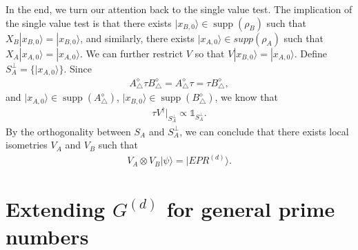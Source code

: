 \documentclass[11pt,letterpaper]{article}
\newcommand{\ket}[1]{|#1\rangle}
\newcommand{\ketbra}[2]{|#1\rangle\langle#2|}
\newcommand{\x}{\otimes}
\DeclareMathOperator{\Tr}{Tr}
\DeclareMathOperator{\supp}{supp}
\newcommand{\1}{\mathbb{1}}
\newcommand{\CHSH}{CHSH^{(d)}}
\newcommand{\SVT}{SVT}
\newcommand{\EPR}[1]{EPR^{(#1)}}
\newcommand{\G}[1]{G^{(#1)}}
\newcommand{\tA}{\tilde{A}}
\theoremstyle{definition}
\begin{document}
In the end, we turn our attention back to the single value test. 
The implication of the single value test is that there
exists $\ket{x_{B,0}} \in \supp(\rho_B)$ such that $X_B \ket{x_{B,0}} = \ket{x_{B,0}}$,
and similarly, there exists $\ket{x_{A,0}} \in supp(\rho_A)$ such that $X_A \ket{x_{A,0}} = \ket{x_{A,0}}$.
We can further restrict $V$ so that $V\ket{x_{B,0}} = \ket{x_{A,0}}$.
Define $S_A^\perp = \{ \ket{x_{A,0}}\}$.
Since 
\begin{align}
	A_\triangle^\diamond \tau B_\triangle^\diamond =A_\triangle^\diamond \tau = \tau B_\triangle^\diamond,
\end{align}
and $\ket{x_{A,0}} \in \supp(A_\triangle^\diamond)$, $\ket{x_{B,0}} \in \supp(B_\triangle^\diamond)$, 
we know that 
\begin{align}
\tau V^\dagger|_{S_A^\perp}  \propto \1_{S_A^\perp}.
\end{align}
By the orthogonality between $S_A$ and $S_A^\perp$, we can conclude that there exists local isometries 
$V_A$ and $V_B$ such that
\begin{align}
	V_A \x V_B \ket{\psi} = \ket{\EPR{d}}.
\end{align}
 
\section{Extending $\G{d}$ for general prime numbers }
\label{sec:extend}





\appendix
\end{document}
